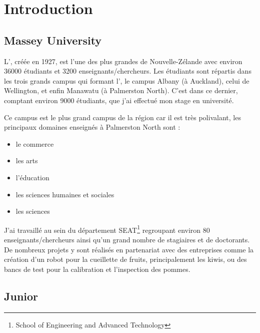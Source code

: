 \section{Introduction}
\label{sec:intro}

\subsection{Massey University}
\label{sub:massey}

L'\umassey, cr\'e\'ee en 1927, est l'une des plus grandes de Nouvelle-Z\'elande avec environ 36000 \'etudiants et 3200 enseignants/chercheurs.
Les \'etudiants sont r\'epartis dans les trois grands campus qui formant l'\umassey, le campus Albany (\`a Auckland), celui de Wellington, et enfin Manawatu (\`a Palmerston North). C'est dans ce dernier, comptant environ 9000 \'etudiants, que j'ai effectu\'e mon stage en universit\'e.

Ce campus est le plus grand campus de la r\'egion car il est tr\`es polivalant, les principaux domaines enseign\'es \`a Palmerston North sont :
\begin{itemize}
\item le commerce
\item les arts
\item l'\'education
\item les sciences humaines et sociales
\item les sciences
\end{itemize}
\vspace{5mm}

J'ai travaill\'e au sein du d\'epartement SEAT\footnote{School of Engineering and Advanced Technology} regroupant environ 80 enseignants/chercheurs ainsi qu'un grand nombre de stagiaires et de doctorants. De nombreux projets y sont r\'ealis\'es en partenariat avec des entreprises comme la cr\'eation d'un robot pour la cueillette de fruits, principalement les kiwis, ou des bancs de test pour la calibration et l'inspection des pommes.

\subsection{Junior}
\label{sub:junior}

